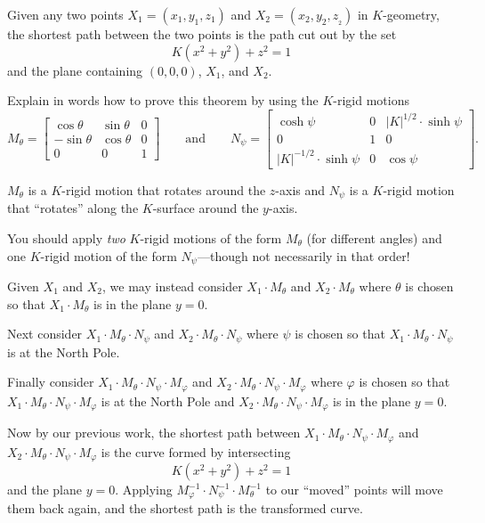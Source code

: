 \documentclass{ximera}
\begin{document}
\begin{theorem}
Given any two points $X_{1}=\left(x_{1},y_{1},z_{1}\right) $ and
$X_{2}=\left(x_{2},y_{2},z_{_{2}}\right) $ in $K$-geometry, the
shortest path between the two points is the path cut out by the set
\[
K\left(  x^{2}+y^{2}\right)  +z^{2}=1
\]
and the plane containing $(0,0,0)$, $X_{1}$, and $X_{2}$.
\end{theorem}


\begin{problem}
  Explain in words how to prove this theorem by using the $K$-rigid
  motions
  \[
  M_\theta=
  \begin{bmatrix}
    \cos\theta & \sin\theta & 0\\
    -\sin\theta & \cos\theta & 0\\
    0 & 0 & 1
  \end{bmatrix}
  \qquad\text{and}\qquad
  N_\psi=
  \begin{bmatrix}
    \cosh\psi & 0 & |K|^{1/2}\cdot\sinh\psi\\
    0 & 1 & 0\\
    |K|^{-1/2}\cdot\sinh\psi & 0 & \cos\psi
  \end{bmatrix}.
  \]
  \begin{hint}
    $M_\theta$ is a $K$-rigid motion that rotates around the $z$-axis
    and $N_\psi$ is a $K$-rigid motion that ``rotates'' along the
    $K$-surface around the $y$-axis.
  \end{hint}
  \begin{hint}
    You should apply \textit{two} $K$-rigid motions of the form
    $M_\theta$ (for different angles) and one $K$-rigid motion of the
    form $N_\psi$---though not necessarily in that order!
  \end{hint}
  \begin{freeResponse}
    Given $X_1$ and $X_2$, we may instead consider $X_1\cdot M_\theta$
    and $X_2\cdot M_\theta$ where $\theta$ is chosen so that $X_1\cdot
    M_\theta$ is in the plane $y=0$.

    Next consider $X_1\cdot M_\theta\cdot N_\psi$ and $X_2\cdot
    M_\theta\cdot N_\psi$ where $\psi$ is chosen so that $X_1\cdot
    M_\theta\cdot N_\psi$ is at the North Pole.

    Finally consider $X_1\cdot M_\theta\cdot N_\psi\cdot M_\varphi$
    and $X_2\cdot M_\theta\cdot N_\psi\cdot M_\varphi$ where $\varphi$
    is chosen so that $X_1\cdot M_\theta\cdot N_\psi\cdot M_\varphi$
    is at the North Pole and $X_2\cdot M_\theta\cdot N_\psi\cdot
    M_\varphi$ is in the plane $y=0$.

    Now by our previous work, the shortest path between $X_1\cdot
    M_\theta\cdot N_\psi\cdot M_\varphi$ and $X_2\cdot M_\theta\cdot
    N_\psi\cdot M_\varphi$ is the curve formed by intersecting
    \[
    K(x^2+y^2)+z^2=1
    \]
    and the plane $y=0$. Applying $M_\varphi^{-1}\cdot
    N_\psi^{-1}\cdot M_\theta^{-1}$ to our ``moved'' points will move
    them back again, and the shortest path is the transformed curve.
  \end{freeResponse}
\end{problem}
\end{document}
